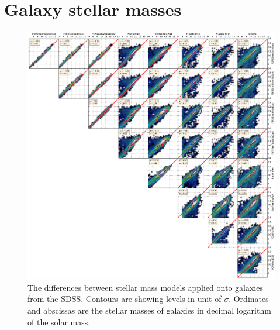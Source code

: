 \section{Galaxy stellar masses}

\begin{figure}[htbp]
    \centering
    \includegraphics[width=\linewidth]{figures/sdss/stellar_mass_models.pdf}
    \caption{The differences between stellar mass models applied onto galaxies
    from the SDSS\@. Contours are showing levels in unit of $\sigma$. Ordinates
and abscissas are the stellar masses of galaxies in decimal logarithm of the
solar mass.\label{fig:stellar_mass_models}}
\end{figure}

